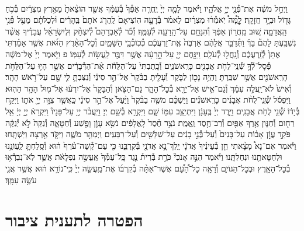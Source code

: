 \documentclass[twoside, openany, parskip=half, 11pt]{book}
\begin{document}
\begin{footnotesize}
\begin{multicols}{2}
\\
וַיְחַ֣ל מֹשֶׁ֔ה אֶת־פְּ֯נֵ֖י יְיָ֣ אֱלֹהָ֑יו וַיֹּ֗אמֶר לָמָ֤ה יְיָ֙ יֶֽחֱרֶ֤ה אַפְּ֯ךָ֙ בְּ֯עַמֶּ֔ךָ אֲשֶׁ֤ר הוֹצֵ֨אתָ֙ מֵאֶ֣רֶץ מִצְרַ֔יִם בְּ֯כֹ֥חַ גָּד֖וֹל וּבְיָ֥ד חֲזָקָֽה׃ לׇׇׇׇׇׇׇׇ֩מָּה֩ יֹֽאמְ֯ר֨וּ מִצְרַ֜יִם לֵאמֹ֗ר בְּ֯רָעָ֤ה הֽוֹצִיאָם֙ לַֽהֲרֹ֤ג אֹתָם֙ בֶּֽהָרִ֔ים וּ֨לְכַלֹּתָ֔ם מֵעַ֖ל פְּ֯נֵ֣י הָֽאֲדָמָ֑ה שׁ֚וּב מֵֽחֲר֣וֹן אַפֶּ֔ךָ וְ֯הִנָּחֵ֥ם עַל־הָֽרָעָ֖ה לְ֯עַמֶּֽךָ׃ זְ֯כֹ֡ר לְ֯אַבְרָהָם֩ לְ֯יִצְחָ֨ק וּֽלְיִשְׂרָאֵ֜ל עֲבָדֶ֗יךָ אֲשֶׁ֨ר נִשְׁבַּ֣עְתָּ לָהֶם֘ בָּךְ֒ וַתְּ֯דַבֵּ֣ר אֲלֵהֶ֔ם אַרְבֶּה֙ אֶֽת־זַרְעֲכֶ֔ם כְּ֯כֽוֹכְ֯בֵ֖י הַשָּׁמָ֑יִם וְ֯כׇל־הָאָ֨רֶץ הַזֹּ֜את אֲשֶׁ֣ר אָמַ֗רְתִּי אֶתֵּן֙ לְ֯זַֽרְעֲכֶ֔ם וְ֯נָֽחֲל֖וּ לְ֯עֹלָֽם׃ וַיִּנָּ֖חֶם יְיָ֑ עַל־הָ֣רָעָ֔ה אֲשֶׁ֥ר דִּבֶּ֖ר לַֽעֲשׂ֥וֹת לְ֯עַמּֽוֹ׃ פ
וַיֹּ֤אמֶר יְיָ֙ אֶל־מֹשֶׁ֔ה פְּ֯סָל־לְ֯ךָ֛ שְׁ֯נֵֽי־לֻחֹ֥ת אֲבָנִ֖ים כָּרִֽאשֹׁנִ֑ים וְ֯כָֽתַבְתִּי֙ עַל־הַלֻּחֹ֔ת אֶ֨ת־הַדְּ֯בָרִ֔ים אֲשֶׁ֥ר הָי֛וּ עַל־הַלֻּחֹ֥ת הָרִֽאשֹׁנִ֖ים אֲשֶׁ֥ר שִׁבַּֽרְתָּ׃ וֶהְיֵ֥ה נָכ֖וֹן לַבֹּ֑קֶר וְ֯עָלִ֤יתָ בַבֹּ֨קֶר֙ אֶל־הַ֣ר סִינַ֔י וְ֯נִצַּבְתָּ֥ לִ֛י שָׁ֖ם עַל־רֹ֥אשׁ הָהָֽר׃ וְ֯אִישׁ֙ לֹא־יַֽעֲלֶ֣ה עִמָּ֔ךְ וְ֯גַם־אִ֥ישׁ אַל־יֵרָ֖א בְּ֯כׇל־הָהָ֑ר גַּם־הַצֹּ֤אן וְ֯הַבָּקָר֙ אַל־יִרְע֔וּ אֶל־מ֖וּל הָהָ֥ר הַהֽוּא׃ 
וַיִּפְסֹ֡ל שְׁ֯נֵֽי־לֻחֹ֨ת אֲבָנִ֜ים כָּרִֽאשֹׁנִ֗ים וַיַּשְׁכֵּ֨ם מֹשֶׁ֤ה בַבֹּ֨קֶר֙ וַיַּ֨עַל֙ אֶל־הַ֣ר סִינַ֔י כַּֽאֲשֶׁ֛ר צִוָּ֥ה יְיָ֖ אֹת֑וֹ וַיִּקַּ֣ח בְּ֯יָד֔וֹ שְׁ֯נֵ֖י לֻחֹ֥ת אֲבָנִֽים׃ וַיֵּ֤רֶד יְיָ֙ בֶּֽעָנָ֔ן וַיִּתְיַצֵּ֥ב עִמּ֖וֹ שָׁ֑ם וַיִּקְרָ֥א בְ֯שֵׁ֖ם יְיָ׃ וַיַּֽעֲבֹ֨ר יְיָ֥ עַל־פָּנָיו֘ וַיִּקְרָא֒ יְיָ֣ יְיָ֔ אֵ֥ל רַח֖וּם וְ֯חַנּ֑וּן אֶ֥רֶךְ אַפַּ֖יִם וְ֯רַב־חֶ֥סֶד וֶֽאֱמֶֽת׃ נֹצֵ֥ר חֶ֨סֶד֙ לָֽאֲלָפִ֔ים נֹשֵׂ֥א עָוֹ֛ן וָפֶ֖שַׁע וְ֯חַטָּאָ֑ה וְ֯נַקֵּה֙ לֹ֣א יְ֯נַקֶּ֔ה פֹּקֵ֣ד עֲוֹ֣ן אָב֗וֹת עַל־בָּנִים֙ וְ֯עַל־בְּ֯נֵ֣י בָנִ֔ים עַל־שִׁלֵּשִׁ֖ים וְ֯עַל־רִבֵּעִֽים׃ וַיְמַהֵ֖ר מֹשֶׁ֑ה וַיִּקֹּ֥ד אַ֖רְצָה וַיִּשְׁתָּֽחוּ׃ וַיֹּ֡אמֶר אִם־נָא֩ מָצָ֨אתִי חֵ֤ן בְּ֯עֵינֶ֨יךָ֙ אֲדֹנָ֔י יֵֽלֶךְ־נָ֥א אֲדֹנָ֖י בְּ֯קִרְבֵּ֑נוּ כִּ֤י עַם־קְ֯שֵׁה־עֹ֨רֶף֙ ה֔וּא וְ֯סָֽלַחְתָּ֛ לַֽעֲוֹנֵ֥נוּ וּלְחַטָּאתֵ֖נוּ וּנְחַלְתָּֽנוּ׃ וַיֹּ֗אמֶר הִנֵּ֣ה אָנֹכִי֘ כֹּרֵ֣ת בְּ֯רִית֒ נֶ֤גֶד כָּֽל־עַמְּ֯ךָ֙ אֶֽעֱשֶׂ֣ה נִפְלָאֹ֔ת אֲשֶׁ֛ר לֹֽא־נִבְרְ֯א֥וּ בְ֯כׇל־הָאָ֖רֶץ וּבְכׇל־הַגּוֹיִ֑ם וְ֯רָאָ֣ה כׇל־הָ֠עָ֠ם אֲשֶׁר־אַתָּ֨ה בְ֯קִרְבּ֜וֹ אֶת־מַֽעֲשֵׂ֤ה יְיָ֙ כִּֽי־נוֹרָ֣א ה֔וּא אֲשֶׁ֥ר אֲנִ֖י עֹשֶׂ֥ה עִמָּֽךְ׃

\end{multicols}

\section*{הפטרה לתענית ציבור}



\end{footnotesize}
\end{document}
